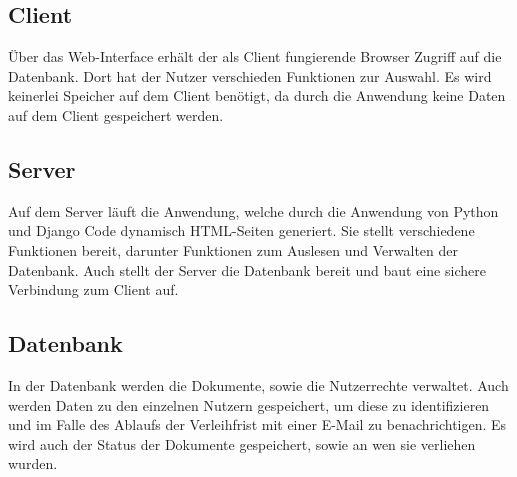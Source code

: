 \subsection{Client}
Über das Web-Interface erhält der als Client fungierende Browser Zugriff 
auf die Datenbank.
Dort hat der Nutzer verschieden Funktionen zur Auswahl.
Es wird keinerlei Speicher auf dem Client benötigt, da durch die Anwendung
keine Daten auf dem Client gespeichert werden.

\subsection{Server}
Auf dem Server läuft die Anwendung, welche durch die Anwendung von Python und 
Django Code dynamisch HTML-Seiten generiert.
Sie stellt verschiedene Funktionen bereit, darunter Funktionen zum Auslesen 
und Verwalten der Datenbank. 
Auch stellt der Server die Datenbank bereit und baut eine sichere Verbindung 
zum Client auf.

\subsection{Datenbank}
In der Datenbank werden die Dokumente, sowie die Nutzerrechte verwaltet.
Auch werden Daten zu den einzelnen Nutzern gespeichert, um diese zu 
identifizieren und im Falle des Ablaufs der Verleihfrist mit einer E-Mail 
zu benachrichtigen.
Es wird auch der Status der Dokumente gespeichert, sowie an wen sie verliehen
wurden.

